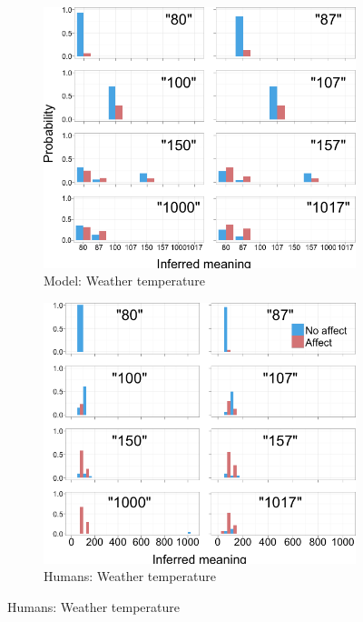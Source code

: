 \documentclass{article} %
\begin{document}
\begin{figure}[t]
        \begin{subfigure}[b]{0.51\textwidth}
                \centering
                \caption{Model: Weather temperature}
                \includegraphics[width=\textwidth]{model_weather_all.png}
	\end{subfigure}
        \begin{subfigure}[b]{0.51\textwidth}
                \centering
                \caption{Humans: Weather temperature}
                \includegraphics[width=\textwidth]{humans_weather_all.png}
        \end{subfigure}
	


\end{figure}
\end{document}
